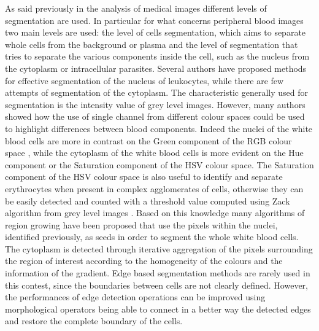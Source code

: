 \documentclass[final,a4paper,12pt,english]{UnicaPhdThesis3}
\begin{document}
As said previously in the analysis of medical images different levels of segmentation are used. In particular for what concerns peripheral blood images two main levels are used: the level of cells segmentation, which aims to separate whole cells from the background or plasma and the level of segmentation that tries to separate the various components inside the cell, such as the nucleus from the cytoplasm or intracellular parasites. Several authors have proposed methods for effective segmentation of the nucleus of leukocytes, while there are few attempts of segmentation of the cytoplasm. The characteristic generally used for segmentation is the intensity value of grey level images. However, many authors showed how the use of single channel from different colour spaces could be used to highlight differences between blood components. Indeed the nuclei of the white blood cells are more in contrast on the Green component of the RGB colour space \cite{Cseke}, while the cytoplasm of the white blood cells is more evident on the Hue component \cite{Wu} or the Saturation component \cite{Halim} of the HSV colour space. The Saturation component of the HSV colour space is also useful to identify and separate erythrocytes \cite{DiR} when present in complex agglomerates of cells, otherwise they can be easily detected and counted with a threshold value computed using Zack algorithm from grey level images \cite{Berge}. Based on this knowledge many algorithms of region growing have been proposed \cite{Kovalev, Lez98, Lez02} that use the pixels within the nuclei, identified previously, as seeds in order to segment the whole white blood cells. The cytoplasm is detected through iterative aggregation of the pixels surrounding the region of interest according to the homogeneity of the colours and the information of the gradient. Edge based segmentation methods are rarely used in this contest, since the boundaries between cells are not clearly defined. However, the performances of edge detection operations can be improved using morphological operators \cite{Piuri, Sco05} being able to connect in a better way the detected edges and restore the complete boundary of the cells. 
\end{document}
